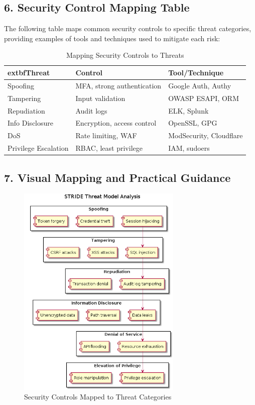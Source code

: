 \subsection*{6. Security Control Mapping Table}
The following table maps common security controls to specific threat categories, providing examples of tools and techniques used to mitigate each risk:
\begin{table}[H]
\centering
\begin{tabular}{|l|l|l|}
\hline
		extbf{Threat} & \textbf{Control} & \textbf{Tool/Technique} \\
\hline
Spoofing & MFA, strong authentication & Google Auth, Authy \\
Tampering & Input validation & OWASP ESAPI, ORM \\
Repudiation & Audit logs & ELK, Splunk \\
Info Disclosure & Encryption, access control & OpenSSL, GPG \\
DoS & Rate limiting, WAF & ModSecurity, Cloudflare \\
Privilege Escalation & RBAC, least privilege & IAM, sudoers \\
\hline
\end{tabular}
\caption{Mapping Security Controls to Threats\cite{owasp,shostack2014}}
\end{table}

\subsection*{7. Visual Mapping and Practical Guidance}
\begin{figure}[H]
	\centering
	\includegraphics[width=0.7\textwidth]{images/stride-analysis}
	\caption{Security Controls Mapped to Threat Categories}
\end{figure}

